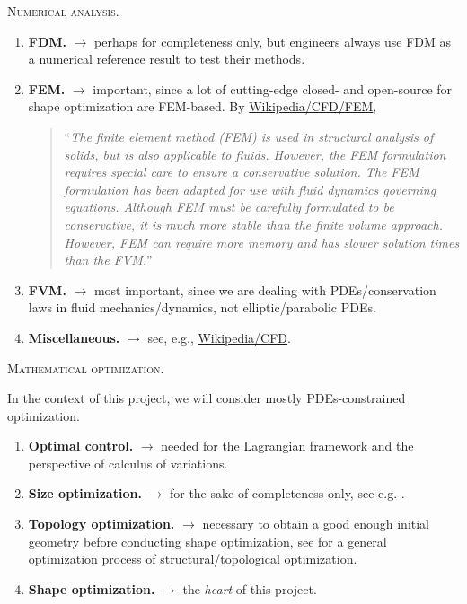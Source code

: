 \documentclass{book}
\numberwithin{equation}{section}
\begin{document}
\begin{tcolorbox}
    \textsc{Numerical analysis.}
    \begin{enumerate}
        \item \textbf{FDM.} $\to$ perhaps for completeness only, but engineers always use FDM as a numerical reference result to test their methods.
        \item \textbf{FEM.} $\to$ important, since a lot of cutting-edge closed- and open-source for shape optimization are FEM-based. By \href{https://en.wikipedia.org/wiki/Computational_fluid_dynamics#Finite_element_method}{Wikipedia/CFD/FEM},
        
        \begin{quotation}
            ``\textit{The finite element method (FEM) is used in structural analysis of solids, but is also applicable to fluids. However, the FEM formulation requires special care to ensure a conservative solution. The FEM formulation has been adapted for use with fluid dynamics governing equations. Although FEM must be carefully formulated to be conservative, it is much more stable than the finite volume approach. However, FEM can require more memory and has slower solution times than the FVM.}''
        \end{quotation}
        \item \textbf{FVM.} $\to$ most important, since we are dealing with PDEs/conservation laws in fluid mechanics/dynamics, not elliptic/parabolic PDEs.
        \item \textbf{Miscellaneous.} $\to$ see, e.g., \href{https://en.wikipedia.org/wiki/Computational_fluid_dynamics}{Wikipedia/CFD}.
    \end{enumerate}
\end{tcolorbox}

\begin{tcolorbox}
    \textsc{Mathematical optimization.}
    
    In the context of this project, we will consider mostly PDEs-constrained optimization.
    \begin{enumerate}
        \item \textbf{Optimal control.} $\to$ needed for the Lagrangian framework and the perspective of calculus of variations.
        \item \textbf{Size optimization.} $\to$ for the sake of completeness only, see e.g. \cite{Haslinger_Makinen2003}.
        \item \textbf{Topology optimization.} $\to$ necessary to obtain a good enough initial geometry before conducting shape optimization, see \cite{Hintermueller_Laurain2007} for a general optimization process of structural/topological optimization.
        \item \textbf{Shape optimization.} $\to$ the \textit{heart} of this project.
    \end{enumerate}
\end{tcolorbox}
\end{document}

